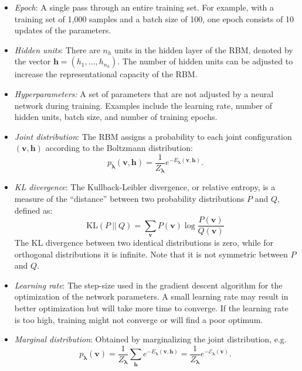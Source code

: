 \documentclass[submission, Phys, hidelnks]{SciPost}
\begin{document}
\begin{itemize}
\item \textit{Epoch}: A single pass through an entire training set. For example,
with a training set of 1,000 samples and a batch size of 100, one epoch consists
of 10 updates of the parameters.

\item \textit{Hidden units}: There are $n_h$ units in the hidden layer of the
RBM, denoted by the vector $\bm{h}=(h_1, \ldots, h_{n_h})$. The number of
hidden units can be adjusted to increase the representational capacity of
the RBM.\@

\item \textit{Hyperparameters:} A set of parameters that are not adjusted by a
neural network during training. Examples include the learning rate, number of
hidden units, batch size, and number of training epochs.

\item \textit{Joint distribution}: The RBM assigns a probability to each joint
configuration $(\bm v, \bm h)$ according to the Boltzmann distribution:
\begin{equation}
   p_{\bm{\lambda}}(\bm{v},\bm{h}) = \frac{1}{Z_{\bm{\lambda}}} e^{-E_{\bm{\lambda}}(\bm{v},\bm{h})}.
\end{equation}

\item \textit{KL divergence}: The Kullback-Leibler divergence, or relative
entropy, is a measure of the ``distance'' between two probability distributions
$P$ and $Q$, defined as:
\begin{equation}
\mathrm{KL}(P\:||\:Q)=\sum_{\bm{v}}P(\bm{v})\log\frac{P(\bm{v})}{Q(\bm{v})}
\end{equation}
The KL divergence between two identical distributions is zero, while for
orthogonal distributions it is infinite.
Note that it is not symmetric between $P$ and $Q$.

\item \textit{Learning rate}: The step-size used in the gradient descent
algorithm for the optimization of the network parameters. A small learning rate
may result in better optimization but will take more time to converge. If the
learning rate is too high, training might not converge or will find a poor optimum.

\item \textit{Marginal distribution}: Obtained by marginalizing the joint distribution, e.g.
\begin{equation}\label{Eq:marginal_distribution}
   p_{\bm{\lambda}}(\bm{v}) = \frac{1}{Z_{\bm{\lambda}}} \sum_{\bm{h}} e^{-E_{\bm{\lambda}}(\bm{v},\bm{h})} = \frac{1}{Z_{\bm{\lambda}}} e^{- \mathcal{E}_{\bm{\lambda}}(\bm{v})}.
\end{equation}


\end{itemize}
\end{document}

